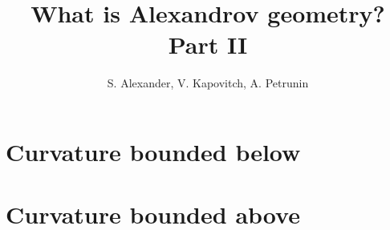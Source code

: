 \documentclass[twoside]{book}
\begin{document}
\frontmatter
\title{What is Alexandrov geometry?\\Part II}
\author{S. Alexander, V. Kapovitch, A. Petrunin}
\maketitle
\mainmatter
\part{Curvature bounded below}
\part{Curvature bounded above}



 
\end{document}
